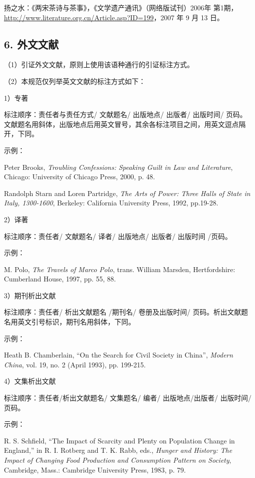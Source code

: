 \documentclass{article}
\begin{document}
扬之水：《两宋茶诗与茶事》，《文学遗产通讯》（网络版试刊）2006年 第1期， \url{http://www.literature.org.cn/Article.asp?ID=199}，2007 年 9 月 13 日。

\subsection*{6.  外文文献}
（1）引证外文文献，原则上使用该语种通行的引证标注方式。

（2）本规范仅列举英文文献的标注方式如下：

1）专著

标注顺序：责任者与责任方式/ 文献题名/ 出版地点/ 出版者/ 出版时间/ 页码。文献题名用斜体，出版地点后用英文冒号，其余各标注项目之间，用英文逗点隔开，下同。

示例：

Peter Brooks, \emph{Troubling Confessions: Speaking Guilt in Law and Literature}, Chicago: University of Chicago Press, 2000, p. 48.


Randolph Starn and Loren Partridge, \emph{The Arts of Power: Three Halls of State in Italy, 1300-1600}, Berkeley: California University Press, 1992, pp.19-28.

2）译著

标注顺序：责任者/ 文献题名/ 译者/ 出版地点/ 出版者/ 出版时间 /页码。

示例：

M. Polo, \emph{The Travels of Marco Polo}, trans. William Marsden, Hertfordshire: Cumberland House, 1997, pp. 55, 88.

 3）期刊析出文献

标注顺序：责任者/ 析出文献题名 /期刊名/ 卷册及出版时间/ 页码。析出文献题名用英文引号标识，期刊名用斜体，下同。

示例：

Heath B. Chamberlain, “On the Search for Civil Society in China”,
\emph{Modern China}, vol. 19, no. 2 (April 1993), pp. 199-215.

4）文集析出文献

标注顺序：责任者/析出文献题名/ 文集题名/ 编者/ 出版地点/出版者/ 出版时间/ 页码。

示例：

R. S. Schfield, “The Impact of Scarcity and Plenty on Population Change in England,” in R. I. Rotberg and T. K. Rabb, eds., \emph{Hunger and History: The Impact of Changing Food Production and Consumption Pattern on Society}, Cambridge, Mass.: Cambridge University Press, 1983, p. 79.
\end{document}
